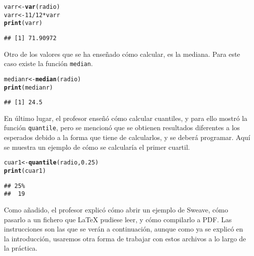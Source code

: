 \documentclass[12pt]{report}\usepackage[]{graphicx}\usepackage[dvipsnames]{xcolor}
\makeatletter
\newcommand{\hlnum}[1]{\textcolor[rgb]{0.686,0.059,0.569}{#1}}%
\newcommand{\hlopt}[1]{\textcolor[rgb]{0,0,0}{#1}}%
\newcommand{\hlstd}[1]{\textcolor[rgb]{0.345,0.345,0.345}{#1}}%
\newcommand{\hlkwb}[1]{\textcolor[rgb]{0.69,0.353,0.396}{#1}}%
\newcommand{\hlkwd}[1]{\textcolor[rgb]{0.737,0.353,0.396}{\textbf{#1}}}%
\newenvironment{kframe}{%
 \def\at@end@of@kframe{}%
 \ifinner\ifhmode%
  \def\at@end@of@kframe{\end{minipage}}%
  \begin{minipage}{\columnwidth}%
 \fi\fi%
 \def\FrameCommand##1{\hskip\@totalleftmargin \hskip-\fboxsep
 \colorbox{shadecolor}{##1}\hskip-\fboxsep
     \hskip-\linewidth \hskip-\@totalleftmargin \hskip\columnwidth}%
 \MakeFramed {\advance\hsize-\width
   \@totalleftmargin\z@ \linewidth\hsize
   \@setminipage}}%
 {\par\unskip\endMakeFramed%
 \at@end@of@kframe}
\newenvironment{knitrout}{}{} %
\makeatother
\begin{document}
\begin{knitrout}
\color{fgcolor}\begin{kframe}
\begin{alltt}
\hlstd{varr} \hlkwb{<-} \hlkwd{var}\hlstd{(radio)}
\hlstd{varr} \hlkwb{<-} \hlnum{11}\hlopt{/}\hlnum{12} \hlopt{*} \hlstd{varr}
\hlkwd{print}\hlstd{(varr)}
\end{alltt}
\begin{verbatim}
## [1] 71.90972
\end{verbatim}
\end{kframe}
\end{knitrout}
			
			Otro de los valores que se ha enseñado cómo calcular, es la mediana. Para este caso existe la función \texttt{median}. 
			
\begin{knitrout}
\color{fgcolor}\begin{kframe}
\begin{alltt}
\hlstd{medianr} \hlkwb{<-} \hlkwd{median}\hlstd{(radio)}
\hlkwd{print}\hlstd{(medianr)}
\end{alltt}
\begin{verbatim}
## [1] 24.5
\end{verbatim}
\end{kframe}
\end{knitrout}
			
			En último lugar, el profesor enseñó cómo calcular cuantiles, y para ello mostró la función \texttt{quantile}, pero se mencionó que se obtienen resultados diferentes a los esperados debido a la forma que tiene de calcularlos, y se deberá programar. Aquí se muestra un ejemplo de cómo se calcularía el primer cuartil. 
			
\begin{knitrout}
\color{fgcolor}\begin{kframe}
\begin{alltt}
\hlstd{cuar1} \hlkwb{<-} \hlkwd{quantile}\hlstd{(radio,} \hlnum{0.25}\hlstd{)}
\hlkwd{print}\hlstd{(cuar1)}
\end{alltt}
\begin{verbatim}
## 25% 
##  19
\end{verbatim}
\end{kframe}
\end{knitrout}
			
			Como añadido, el profesor explicó cómo abrir un ejemplo de Sweave, cómo pasarlo a un fichero que \LaTeX{} pudiese leer, y cómo compilarlo a PDF. Las instrucciones son las que se verán a continuación, aunque como ya se explicó en la introducción, usaremos otra forma de trabajar con estos archivos a lo largo de la práctica. 
			
\end{document}
